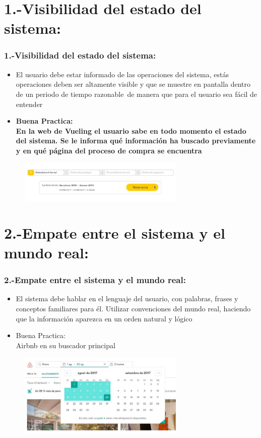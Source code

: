 \documentclass[11pt]{beamer}
\begin{document}
\section{1.-Visibilidad del estado del sistema:}
\begin{frame}
\frametitle{1.-Visibilidad del estado del sistema:}

\begin{itemize}
\item El usuario debe estar informado de las operaciones del sistema, estás operaciones deben ser altamente visible y que se muestre en pantalla dentro de un periodo de tiempo razonable de manera que para el usuario sea fácil de entender
\item \bf Buena Practica:\\ En la web de Vueling el usuario sabe en todo momento el estado del sistema. Se le informa qué información ha buscado previamente y en qué página del proceso de compra se encuentra
\end{itemize}

\begin{figure}
  \centering
  \includegraphics[width=8.0cm,height=2.0cm]{img/Imagen1.jpg}
\end{figure}
\end{frame}

\section{2.-Empate entre el sistema y el mundo real:}
\begin{frame}
\frametitle{2.-Empate entre el sistema y el mundo real:}

\begin{itemize}
\item El sistema debe hablar en el lenguaje del usuario, con palabras, frases y conceptos familiares para él. Utilizar convenciones del mundo real, haciendo que la información aparezca en un orden natural y lógico
\item Buena Practica:\\  Airbnb en su buscador principal
\end{itemize}

\begin{figure}
  \centering
  \includegraphics[width=8.0cm,height=4.0cm]{img/Imagen2.jpg}
\end{figure}
\end{frame}
\end{document}
